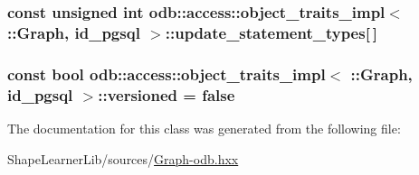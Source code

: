 \subsubsection[{update\+\_\+statement\+\_\+types}]{\setlength{\rightskip}{0pt plus 5cm}const unsigned int odb\+::access\+::object\+\_\+traits\+\_\+impl$<$ \+::{\bf Graph}, id\+\_\+pgsql $>$\+::update\+\_\+statement\+\_\+types\mbox{[}$\,$\mbox{]}\hspace{0.3cm}{\ttfamily [static]}}\label{classodb_1_1access_1_1object__traits__impl_3_01_1_1_graph_00_01id__pgsql_01_4_a1e7b0e1215153564fa1333adafb180a1}
\hypertarget{classodb_1_1access_1_1object__traits__impl_3_01_1_1_graph_00_01id__pgsql_01_4_afd90031a3c1d36106cdda18876c18999}{}
\subsubsection[{versioned}]{\setlength{\rightskip}{0pt plus 5cm}const {\bf bool} odb\+::access\+::object\+\_\+traits\+\_\+impl$<$ \+::{\bf Graph}, id\+\_\+pgsql $>$\+::versioned = false\hspace{0.3cm}{\ttfamily [static]}}\label{classodb_1_1access_1_1object__traits__impl_3_01_1_1_graph_00_01id__pgsql_01_4_afd90031a3c1d36106cdda18876c18999}


The documentation for this class was generated from the following file\+:\begin{DoxyCompactItemize}
\item 
Shape\+Learner\+Lib/sources/\hyperlink{_graph-odb_8hxx}{Graph-\/odb.\+hxx}\end{DoxyCompactItemize}
